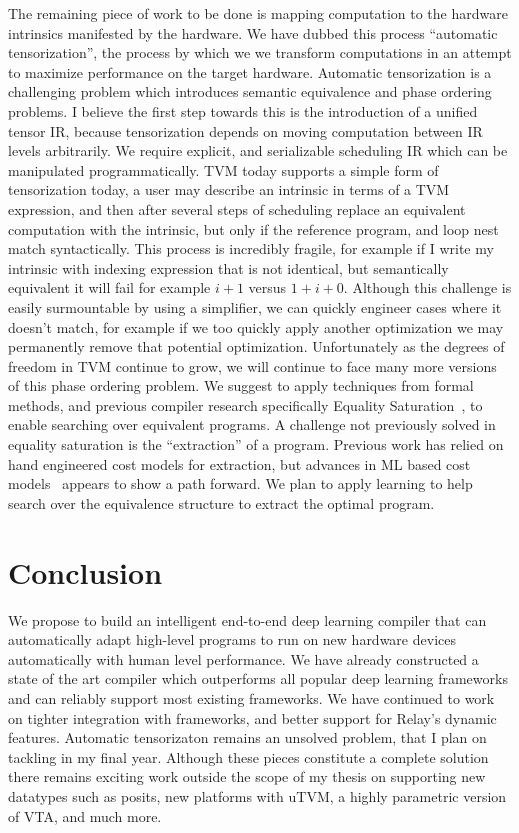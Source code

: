 The remaining piece of work to be done is mapping
    computation to the hardware intrinsics manifested by the hardware.
We have dubbed this process ``automatic tensorization'', the process by which we
    we transform computations in an attempt to maximize performance on the target
    hardware.
Automatic tensorization is a challenging problem which introduces
    semantic equivalence and phase ordering problems.
I believe the first step towards this is the introduction of a unified
    tensor IR, because tensorization depends on moving computation between
    IR levels arbitrarily.
We require explicit, and serializable scheduling IR which can be manipulated
    programmatically.
TVM today supports a simple form of tensorization today, a user may describe
    an intrinsic in terms of a TVM expression, and then after several steps
    of scheduling replace an equivalent computation with the intrinsic,
    but only if the reference program, and loop nest match syntactically.
This process is incredibly fragile, for example if I write my intrinsic with
    indexing expression that is not identical, but semantically equivalent
    it will fail for example $i + 1$ versus $1 + i + 0$.
Although this challenge is easily surmountable by using a simplifier,
    we can quickly engineer cases where it doesn't match, for example
    if we too quickly apply another optimization we may permanently
    remove that potential optimization.
Unfortunately as the degrees of freedom in TVM continue to grow, we
    will continue to face many more versions of this phase ordering
    problem.
We suggest to apply techniques from formal methods, and previous compiler
    research specifically Equality Saturation~\citep{eqsat}, to enable searching
    over equivalent programs.
A challenge not previously solved in equality saturation is the ``extraction''
    of a program.
Previous work has relied on hand engineered cost models for extraction, but
    advances in ML based cost models~\citep{autotvm} appears to show a path
    forward.
We plan to apply learning to help search over the equivalence structure to
    extract the optimal program.

    \section{Conclusion}
\label{sec:conclusion}

We propose to build an intelligent end-to-end deep learning compiler that can
automatically adapt high-level programs to run on new hardware devices automatically
with human level performance. We have already constructed a state of the art compiler
which outperforms all popular deep learning frameworks and can reliably support most
existing frameworks. We have continued to work on tighter integration with frameworks,
and better support for Relay's dynamic features. Automatic tensorizaton remains an unsolved
problem, that I plan on tackling in my final year. Although these pieces constitute a
complete solution there remains exciting work outside the scope of my thesis on
supporting new datatypes such as posits, new platforms with uTVM, a highly
parametric version of VTA, and much more.
